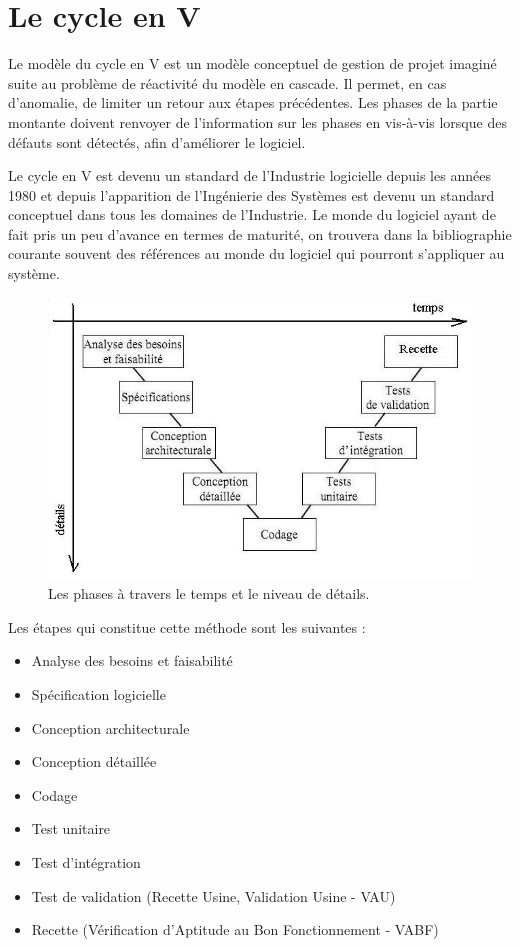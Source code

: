 \section{Le cycle en V}
Le modèle du cycle en V est un modèle conceptuel de gestion de projet imaginé suite au problème de réactivité du modèle en cascade. Il permet, en cas d'anomalie, de limiter un retour aux étapes précédentes. Les phases  de la partie montante doivent renvoyer de l'information sur les phases en vis-à-vis lorsque des défauts sont détectés, afin d'améliorer le logiciel.

Le cycle en V est devenu un standard de l'Industrie logicielle depuis les années 1980 et depuis l'apparition de l'Ingénierie des Systèmes est devenu un standard conceptuel dans tous les domaines de l'Industrie. Le monde du logiciel ayant de fait pris un peu d'avance en termes de maturité, on trouvera dans la bibliographie courante souvent des références au monde du logiciel qui pourront s'appliquer au système.
\begin{figure}
\center
\includegraphics[width=12cm]{images/cyclev.png}
\caption{Les phases à travers le temps et le niveau de détails.}
\label{cyclev}
\end{figure}

Les étapes qui constitue cette méthode sont les suivantes :
\begin{itemize}
    \item Analyse des besoins et faisabilité
    \item Spécification logicielle
    \item Conception architecturale
    \item Conception détaillée
    \item Codage
    \item Test unitaire
    \item Test d'intégration
    \item Test de validation (Recette Usine, Validation Usine - VAU)
    \item Recette (Vérification d'Aptitude au Bon Fonctionnement - VABF)
\end{itemize}\medskip
 
